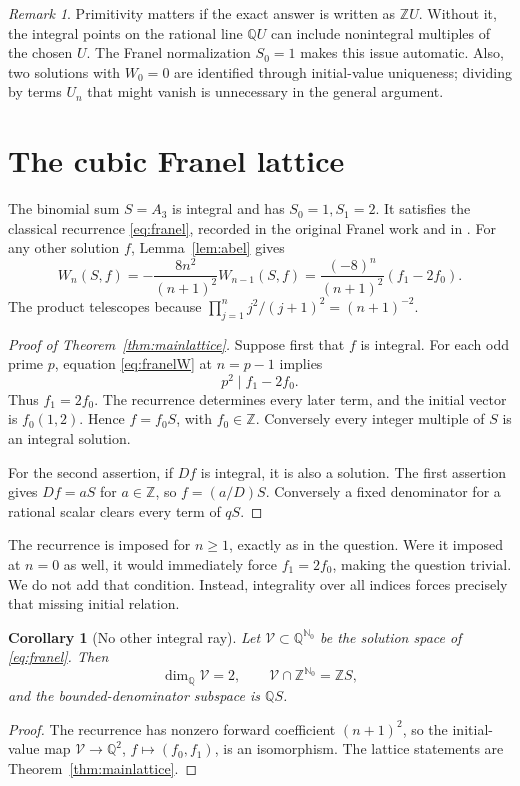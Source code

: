 \documentclass[11pt,a4paper]{article}
\newtheorem{corollary}[theorem]{Corollary}
\theoremstyle{definition}\newtheorem{definition}[theorem]{Definition}
\theoremstyle{remark}\newtheorem{remark}[theorem]{Remark}
\newcommand{\Q}{\mathbb Q}\newcommand{\Z}{\mathbb Z}\newcommand{\N}{\mathbb N}\newcommand{\R}{\mathbb R}\newcommand{\C}{\mathbb C}
\begin{document}
\begin{remark}
Primitivity matters if the exact answer is written as $\Z U$. Without it,
the integral points on the rational line $\Q U$ can include nonintegral
multiples of the chosen $U$. The Franel normalization $S_0=1$ makes this
issue automatic. Also, two solutions with $W_0=0$ are identified through
initial-value uniqueness; dividing by terms $U_n$ that might vanish is
unnecessary in the general argument.
\end{remark}

\section{The cubic Franel lattice}\label{sec:lattice}
The binomial sum $S=A_3$ is integral and has $S_0=1,S_1=2$. It satisfies the
classical recurrence \eqref{eq:franel}, recorded in the original Franel work
and in \cite{Tonien,SZ}. For any other solution $f$, Lemma~\ref{lem:abel} gives
\begin{equation}\label{eq:franelW}
 W_n(S,f)=-\frac{8n^2}{(n+1)^2}W_{n-1}(S,f)
         =\frac{(-8)^n}{(n+1)^2}(f_1-2f_0).
\end{equation}
The product telescopes because
$\prod_{j=1}^n j^2/(j+1)^2=(n+1)^{-2}$.

\begin{proof}[Proof of Theorem~\ref{thm:mainlattice}]
Suppose first that $f$ is integral. For each odd prime $p$, equation
\eqref{eq:franelW} at $n=p-1$ implies
\[
 p^2\mid f_1-2f_0.
\]
Thus $f_1=2f_0$. The recurrence determines every later term, and the initial
vector is $f_0(1,2)$. Hence $f=f_0S$, with $f_0\in\Z$.
Conversely every integer multiple of $S$ is an integral solution.

For the second assertion, if $Df$ is integral, it is also a solution. The
first assertion gives $Df=aS$ for $a\in\Z$, so $f=(a/D)S$. Conversely a fixed
denominator for a rational scalar clears every term of $qS$.
\end{proof}

The recurrence is imposed for $n\ge1$, exactly as in the question. Were it
imposed at $n=0$ as well, it would immediately force $f_1=2f_0$, making the
question trivial. We do not add that condition. Instead, integrality over all
indices forces precisely that missing initial relation.

\begin{corollary}[No other integral ray]
Let $\mathcal V\subset\Q^{\N_0}$ be the solution space of
\eqref{eq:franel}. Then
\[
 \dim_\Q\mathcal V=2,\qquad
 \mathcal V\cap\Z^{\N_0}=\Z S,
\]
and the bounded-denominator subspace is $\Q S$.
\end{corollary}
\begin{proof}
The recurrence has nonzero forward coefficient $(n+1)^2$, so the initial-value
map $\mathcal V\to\Q^2$, $f\mapsto(f_0,f_1)$, is an isomorphism. The lattice
statements are Theorem~\ref{thm:mainlattice}.
\end{proof}
\end{document}
